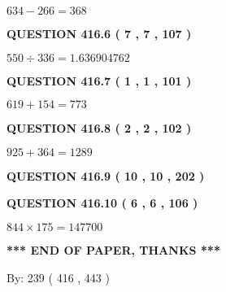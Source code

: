 \documentclass{ctexart}
\begin{document}
$ %
634 -  %
266=   %
368$
 
 
  
\vspace{0.2in}
  
{\textbf{\Large{QUESTION
416.6 
 ( 7 , 7 , 107 )
}}}
  
  
 
 

$ %
550 \div  %
336=   %
1.636904762$
 
 
  
\vspace{0.2in}
  
{\textbf{\Large{QUESTION
416.7 
 ( 1 , 1 , 101 )
}}}
  
  
 
 

$ %
619 +  %
154=   %
773$
 
 
  
\vspace{0.2in}
  
{\textbf{\Large{QUESTION
416.8 
 ( 2 , 2 , 102 )
}}}
  
  
 
 

$ %
925 +  %
364=   %
1289$
 
 
  
\vspace{0.2in}
  
{\textbf{\Large{QUESTION
416.9 
 ( 10 , 10 , 202 )
}}}
  
  
  
\vspace{0.2in}
  
{\textbf{\Large{QUESTION
416.10 
 ( 6 , 6 , 106 )
}}}
  
  
 
 

$ %
844 \times  %
175=   %
147700$
 
 
   
   
 \vspace{0.2in}
 
   
   
   
   
\vspace{1.0in} 
{\textbf{\large{ *** END OF PAPER, THANKS *** }}} 
   
   
\hspace{1.0in} By: 
 239 ( 416 ,  443 )
   
   
   
   
\newpage 
\setcounter{page}{ 
   417001 } 
   
   
   
\end{document}
